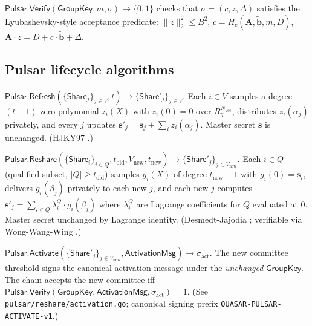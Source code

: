 \begin{definition}
\label{def:pulsar-verify}
$\mathsf{Pulsar.Verify}(\mathsf{GroupKey}, m, \sigma) \to \{0, 1\}$
checks that $\sigma = (c, z, \Delta)$ satisfies the Lyubashevsky-style
acceptance predicate:
$\|z\|_2^2 \leq B^2$,
$c = H_c(\mathbf{A}, \tilde{\mathbf{b}}, m, D)$,
$\mathbf{A}\cdot z = D + c\cdot\tilde{\mathbf{b}} + \Delta$.
\end{definition}

\subsection*{Pulsar lifecycle algorithms}

\begin{definition}
\label{def:pulsar-refresh}
$\mathsf{Pulsar.Refresh}(\{\mathsf{Share}_j\}_{j \in V}, t)
\to \{\mathsf{Share}'_j\}_{j \in V}$.
Each $i \in V$ samples a degree-$(t-1)$ zero-polynomial $z_i(X)$
with $z_i(0) = 0$ over $R_q^{N_{\textrm{vec}}}$, distributes
$z_i(\alpha_j)$ privately, and every $j$ updates
$\mathbf{s}'_j = \mathbf{s}_j + \sum_i z_i(\alpha_j)$. Master secret
$\mathbf{s}$ is unchanged. (HJKY97 \cite{hjky97}.)
\end{definition}

\begin{definition}
\label{def:pulsar-reshare}
$\mathsf{Pulsar.Reshare}(\{\mathsf{Share}_i\}_{i \in Q}, t_{\text{old}},
V_{\text{new}}, t_{\text{new}}) \to \{\mathsf{Share}'_j\}_{j \in V_{\text{new}}}$.
Each $i \in Q$ (qualified subset, $|Q| \geq t_{\text{old}}$) samples
$g_i(X)$ of degree $t_{\text{new}}-1$ with $g_i(0) = \mathbf{s}_i$,
delivers $g_i(\beta_j)$ privately to each new $j$, and each new $j$
computes $\mathbf{s}'_j = \sum_{i \in Q} \lambda^Q_i \cdot g_i(\beta_j)$
where $\lambda^Q_i$ are Lagrange coefficients for $Q$ evaluated at $0$.
Master secret unchanged by Lagrange identity. (Desmedt-Jajodia
\cite{desmedtjajodia97}; verifiable via Wong-Wang-Wing
\cite{wongwangwing02}.)
\end{definition}

\begin{definition}
\label{def:pulsar-activate}
$\mathsf{Pulsar.Activate}(\{\mathsf{Share}'_j\}_{j \in V_{\text{new}}},
\mathsf{ActivationMsg}) \to \sigma_{\text{act}}$.
The new committee threshold-signs the canonical activation message
under the \emph{unchanged} $\mathsf{GroupKey}$. The chain accepts the
new committee iff $\mathsf{Pulsar.Verify}(\mathsf{GroupKey},
\mathsf{ActivationMsg}, \sigma_{\text{act}}) = 1$. (See
\texttt{pulsar/reshare/activation.go}; canonical signing prefix
\texttt{QUASAR-PULSAR-ACTIVATE-v1}.)
\end{definition}

